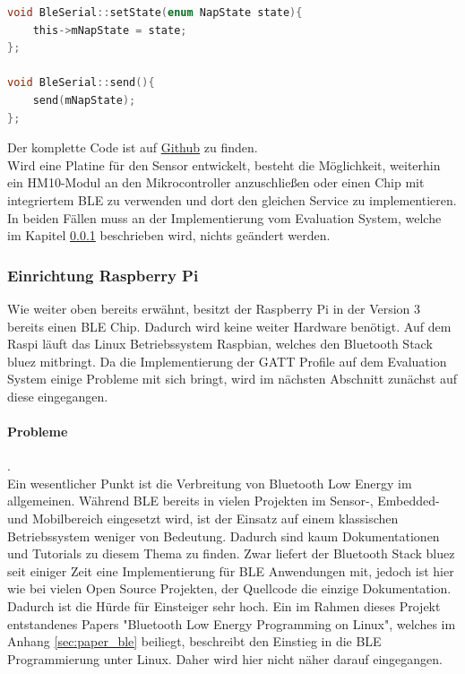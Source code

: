\begin{lstlisting}[language=C, caption=send und setState Methoden aus der BleSerial bibliothek, label=lst:bleSerial_methods ]
void BleSerial::setState(enum NapState state){
	this->mNapState = state;
};

void BleSerial::send(){
	send(mNapState);
};
\end{lstlisting}

Der komplette Code ist auf \href{https://github.com/jomaway/poop-face-detection_sensor/tree/master/arduino/libraries/BleSerial}{Github}  zu finden. \\

Wird eine Platine für den Sensor entwickelt, besteht die Möglichkeit, weiterhin ein HM10-Modul an den Mikrocontroller anzuschließen oder einen Chip mit integriertem BLE zu verwenden und dort den gleichen Service zu implementieren. In beiden Fällen muss an der Implementierung vom Evaluation System, welche im Kapitel \ref{subsubsec:ble_raspi} beschrieben wird, nichts geändert werden.

\subsubsection{Einrichtung Raspberry Pi}
\label{subsubsec:ble_raspi}
Wie weiter oben bereits erwähnt, besitzt der Raspberry Pi in der Version 3 bereits einen BLE Chip. Dadurch wird keine weiter Hardware benötigt. Auf dem Raspi läuft das Linux Betriebssystem Raspbian, welches den Bluetooth Stack bluez mitbringt. Da die Implementierung der GATT Profile auf dem Evaluation System einige Probleme mit sich bringt, wird im nächsten Abschnitt zunächst auf diese eingegangen.

\paragraph{Probleme}. \\ 
Ein wesentlicher Punkt ist die Verbreitung von Bluetooth Low Energy im allgemeinen. Während BLE bereits in vielen Projekten im Sensor-, Embedded- und Mobilbereich eingesetzt wird, ist der Einsatz auf einem klassischen Betriebssystem weniger von Bedeutung. Dadurch sind kaum Dokumentationen und Tutorials zu diesem Thema zu finden. Zwar liefert der Bluetooth Stack bluez seit einiger Zeit eine Implementierung für BLE Anwendungen mit, jedoch ist hier wie bei vielen Open Source Projekten, der Quellcode die einzige Dokumentation. Dadurch ist die Hürde für Einsteiger sehr hoch. Ein im Rahmen dieses Projekt entstandenes Papers "Bluetooth Low Energy Programming on Linux", welches im Anhang \ref{sec:paper_ble} beiliegt, beschreibt den Einstieg in die BLE Programmierung unter Linux. Daher wird hier nicht näher darauf eingegangen. 

